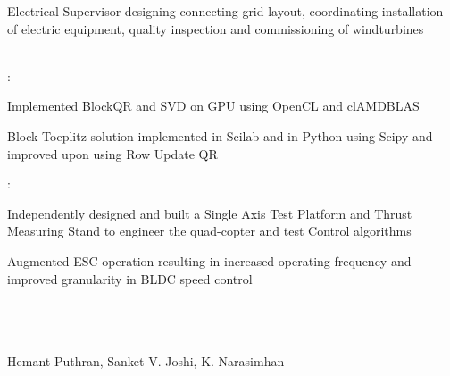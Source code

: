 \documentclass[]{hemant-style}
\begin{document}
\begin{minipage}[]{\textwidth}
\begin{minipage}{\textwidth}
\begin{minipage}[t][][c]{.75\textwidth}
\begin{hitemize}
                                \item Electrical Supervisor designing connecting grid layout, coordinating installation of electric
                                equipment, quality inspection and commissioning of windturbines
                            \end{hitemize}
                            \vspace{1em}
                             \\
                            :
                            \begin{hitemize}
                                \item Implemented BlockQR and SVD on GPU using OpenCL and clAMDBLAS
                                \item Block Toeplitz solution implemented in Scilab and in Python using Scipy and improved upon using Row Update QR
                            \end{hitemize}
                            :
                            \begin{hitemize}
                                \item Independently designed and built a Single Axis Test Platform and Thrust Measuring Stand to engineer the quad-copter and test Control algorithms
                                \item Augmented ESC operation resulting in increased operating frequency  and improved granularity in BLDC speed control
                            \end{hitemize}
                            \vspace{1em}
                             \\
                            \\
                            \\
                            Hemant Puthran, Sanket V. Joshi, K. Narasimhan
                            \end{minipage}
                \end{minipage}
        \end{minipage}
        
    
\end{document}

